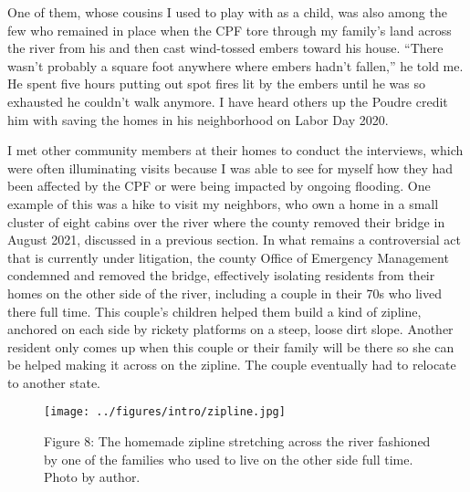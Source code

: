 \documentclass[
]{article}
\begin{document}
One of them, whose cousins I used to play with as a child, was also among the few who remained in place when the CPF tore through my family's land across the river from his and then cast wind-tossed embers toward his house. ``There wasn't probably a square foot anywhere where embers hadn't fallen,'' he told me. He spent five hours putting out spot fires lit by the embers until he was so exhausted he couldn't walk anymore. I have heard others up the Poudre credit him with saving the homes in his neighborhood on Labor Day 2020.

I met other community members at their homes to conduct the interviews, which were often illuminating visits because I was able to see for myself how they had been affected by the CPF or were being impacted by ongoing flooding. One example of this was a hike to visit my neighbors, who own a home in a small cluster of eight cabins over the river where the county removed their bridge in August 2021, discussed in a previous section. In what remains a controversial act that is currently under litigation, the county Office of Emergency Management condemned and removed the bridge, effectively isolating residents from their homes on the other side of the river, including a couple in their 70s who lived there full time. This couple's children helped them build a kind of zipline, anchored on each side by rickety platforms on a steep, loose dirt slope. Another resident only comes up when this couple or their family will be there so she can be helped making it across on the zipline. The couple eventually had to relocate to another state.

\begin{figure}
\centering
\texttt{[image: ../figures/intro/zipline.jpg]}
\caption{Figure 8: The homemade zipline stretching across the river fashioned by one of the families who used to live on the other side full time. Photo by author.}
\end{figure}
\end{document}
